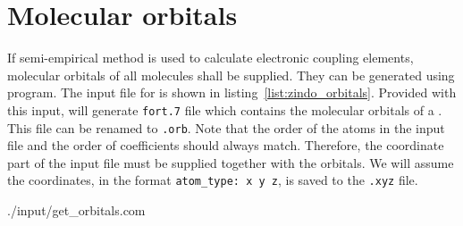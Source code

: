 \section{Molecular orbitals}
If semi-empirical method is used to calculate electronic coupling elements, molecular orbitals of all molecules shall be supplied. They can be generated using \gaussian program. The \gaussian input file for \dcvt is shown in listing~\ref{list:zindo_orbitals}. Provided with this input, \gaussian will generate \texttt{fort.7} file which contains the molecular orbitals of a \dcvt. This file can be renamed to \texttt{\dcvt.orb}. Note that the order of the atoms in the input file and the order of coefficients should always match. Therefore, the coordinate part of the input file must be supplied together with the orbitals. We will assume the coordinates, in the format \texttt{atom\_type: x y z}, is saved to the \texttt{\dcvt.xyz} file.

\clearpage
\vskip 0.1cm
\noindent
%
{./input/get_orbitals.com}
%

